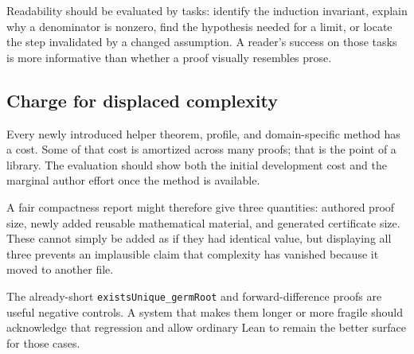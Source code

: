\documentclass[11pt,letterpaper]{article}
\theoremstyle{definition}
\theoremstyle{remark}
\newcommand{\decl}[1]{{\small\urlstyle{tt}\nolinkurl{#1}}}
\begin{document}
Readability should be evaluated by tasks: identify the induction invariant, explain why a denominator is nonzero, find the hypothesis needed for a limit, or locate the step invalidated by a changed assumption. A reader's success on those tasks is more informative than whether a proof visually resembles prose.

\subsection{Charge for displaced complexity}
Every newly introduced helper theorem, profile, and domain-specific method has a cost. Some of that cost is amortized across many proofs; that is the point of a library. The evaluation should show both the initial development cost and the marginal author effort once the method is available.

A fair compactness report might therefore give three quantities: authored proof size, newly added reusable mathematical material, and generated certificate size. These cannot simply be added as if they had identical value, but displaying all three prevents an implausible claim that complexity has vanished because it moved to another file.

The already-short \decl{existsUnique_germRoot} and forward-difference proofs are useful negative controls. A system that makes them longer or more fragile should acknowledge that regression and allow ordinary Lean to remain the better surface for those cases.
\end{document}
